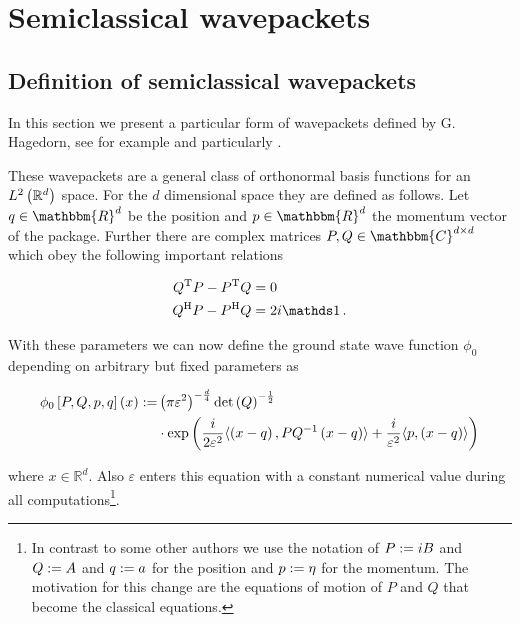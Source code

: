 \chapter{Semiclassical wavepackets}
\label{ch:wave_packets}

\section{Definition of semiclassical wavepackets}

In this section we present a particular form of wavepackets defined
by G. Hagedorn, see for example \cite{H_semiclassical_i,H_semiclassical_iii}
and particularly \cite{H_ladder_operators}.

These wavepackets are a general class of orthonormal basis functions for an $L^2\left( \mathbb{R}^d \right)$
space. For the $d$ dimensional space they are defined as follows. Let $q \in \mathbbm{R}^d$
be the position and $p \in \mathbbm{R}^d$ the momentum vector of the package. Further
there are complex matrices $P, Q \in \mathbbm{C}^{d \times d}$ which obey the following
important relations

\begin{equation} \label{eq:symplecticity_condition}
\begin{split}
  Q\T P - P\T Q & = 0 \\
  Q\herm P - P\herm Q & = 2 i \id  \,.
\end{split}
\end{equation}

With these parameters we can now define the ground state wave function $\phi_0$
depending on arbitrary but fixed parameters as

\begin{equation} \label{eq:hagedorn_groundstate_dd}
\begin{split}
  \phi_0 \left[ P,Q,p,q \right] \left( x \right)
  := &
  \left(\pi\varepsilon^2\right)^{-\frac{d}{4}} \det\left(Q\right)^{-\frac{1}{2}} \\
  & \cdot \exp \left(
      \frac{i}{2\varepsilon^2} \langle \left(x-q\right) , PQ^{-1}\left(x-q\right) \rangle
      + \frac{i}{\varepsilon^2} \langle p , \left(x-q\right) \rangle
  \right)
\end{split}
\end{equation}

where $x \in \mathbb{R}^d$. Also $\varepsilon$ enters this equation with a constant
numerical value during all computations\footnote{
In contrast to some other authors we use the notation of $P := iB$ and $Q := A$
and $q := a$ for the position and $p := \eta$ for the momentum. The motivation
for this change are the equations of motion of $P$ and $Q$ that become the
classical equations.}.

